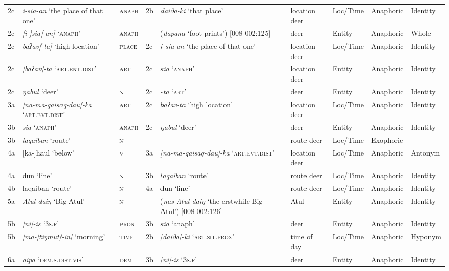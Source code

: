 \documentclass[output=paper
,modfonts
,nonflat]{langsci/langscibook}
\begin{document}
\begin{sidewaystable}
{\begin{tabular}{ll l lll lll}
	2c & \textit{i-sia-an} ‘the place of that one’ & \textsc{anaph} & 2b & \textit{daiða-ki} ‘that place’ & location deer & Loc/Time & Anaphoric & Identity\\
	2c & \textit{[i-]sia[-an]} ‘\textsc{anaph}’ & \textsc{anaph} & ~ & (\textit{dapana} ‘foot prints’) [008-002:125] & deer & Entity & Anaphoric & Whole\\
	2c & \textit{baʔav[-ta]} ‘high location’ & \textsc{place} & 2c & \textit{i-sia-an} ‘the place of that one’ & location deer & Loc/Time & Anaphoric & Identity\\
	2c & \textit{[baʔav]-ta} ‘\textsc{art.ent.dist}’ & \textsc{art} & 2c & \textit{sia} ‘\textsc{anaph}’ & location deer & Entity & Anaphoric & Identity\\
	2c & \textit{ŋabul} ‘deer’ & \textsc{n} & 2c &  \textit{{}-ta} ‘\textsc{art}’ & deer & Entity & Anaphoric & Identity\\
	3a & \textit{[na-ma-qaisaq-dau]-ka} ‘\textsc{art.evt.dist}’ & \textsc{art} & 2c & \textit{baʔav-ta} ‘high location’ & location deer & Loc/Time & Anaphoric & Identity\\
	3b & \textit{sia} ‘\textsc{anaph}’ & \textsc{anaph} & 2c & \textit{ŋabul} ‘deer’ & deer & Entity & Anaphoric & Identity\\
	3b & \textit{laqaiban} ‘route’ & \textsc{n} & ~ & ~ & route deer & Loc/Time & Exophoric & ~\\
	4a & [ka-]haul ‘below’ & \textsc{v} & 3a & \textit{[na-ma-qaisaq-dau]-ka} ‘\textsc{art.evt.dist}’ & location deer & Loc/Time & Anaphoric & Antonym\\
	4a & dun ‘line’ & \textsc{n} & 3b & \textit{laqaiban} ‘route’ & route deer & Loc/Time & Anaphoric & Identity\\
	4b & laqaiban ‘route’ & \textsc{n} & 4a & dun ‘line’ & route deer & Loc/Time & Anaphoric & Identity\\
	5a & \textit{Atul daiŋ} ‘Big Atul’ & \textsc{n} & ~ & (\textit{nas-Atul daiŋ} ‘the erstwhile Big Atul’) [008-002:126] & Atul & Entity & Anaphoric & Identity\\
	5b & \textit{[ni]-is} ‘\textsc{3s.f}’ & \textsc{pron} & 3b & \textit{sia} ‘anaph’ & deer & Entity & Anaphoric & Identity\\
	5b & \textit{[ma-]tiŋmut[-in]} ‘morning’ & \textsc{time} & 2b & \textit{[daiða]-ki} ‘\textsc{art.sit.prox}’ & time of day & Loc/Time & Anaphoric & Hyponym\\
	6a & \textit{aipa} ‘\textsc{dem.s.dist.vis}’ & \textsc{dem} & 3b & \textit{[ni]-is} ‘\textsc{3s.f}’ & deer & Entity & Anaphoric & Identity\\

\end{tabular}}
\end{sidewaystable}
\end{document}
